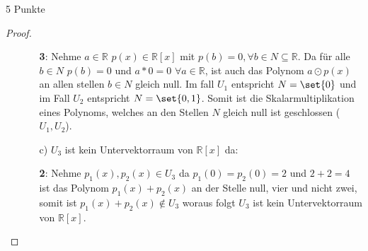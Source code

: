 \documentclass{problemset}
\begin{document}
\begin{problem}{5 Punkte}
\begin{proof}
\begin{enumerate}
\begin{enumerate}
                        \textbf{3}: Nehme $a \in \mathbb{R}$ $p(x) \in \mathbb{R}[x]$ mit $p(b)= 0, \forall b \in N \subseteq \mathbb{R}$.
                        Da für alle $b \in N$ $p(b) = 0$ und $a * 0 = 0$ $\forall a \in \mathbb{R}$, ist auch das Polynom $a \odot p(x)$ an allen stellen $b \in N$ gleich null.
                        Im fall $U_1$ entspricht $N = \set{0}$ und im Fall $U_2$ entspricht $N = \set{0, 1}$.
                        Somit ist die Skalarmultiplikation eines Polynoms, welches an den Stellen $N$ gleich null ist geschlossen ($U_1, U_2$). \checkmark
                  \item [c)] $U_3$ ist kein Untervektorraum von $\mathbb{R}[x]$ da:

                        \textbf{2}: Nehme $p_1(x), p_2(x) \in U_3$ da $p_1(0) = p_2(0) = 2$ und $2 + 2 = 4$
                        ist das Polynom $p_1(x) + p_2(x)$ an der Stelle null, vier und nicht zwei, somit ist $p_1(x) + p_2(x) \not \in U_3$
                        woraus folgt $U_3$ ist kein Untervektorraum von $\mathbb{R}[x]$.
              \end{enumerate}
    \end{enumerate}

\end{proof}
\end{problem}
\end{document}
